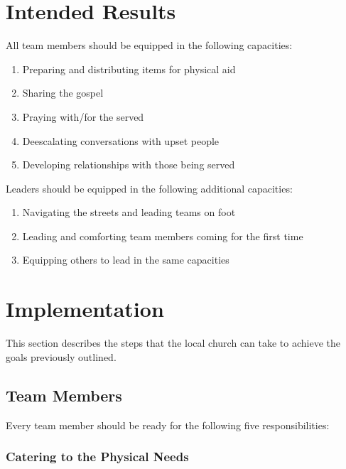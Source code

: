 \documentclass[12pt]{article}
\begin{document}
\qJamesOneTwentySeven

\section{Intended Results}

    All team members should be equipped in the following capacities:
    \begin{enumerate}
        \item Preparing and distributing items for physical aid
        \item Sharing the gospel
        \item Praying with/for the served
        \item Deescalating conversations with upset people
        \item Developing relationships with those being served
    \end{enumerate}

    Leaders should be equipped in the following additional capacities:
    \begin{enumerate}
        \item Navigating the streets and leading teams on foot
        \item Leading and comforting team members coming for the first time
        \item Equipping others to lead in the same capacities
    \end{enumerate}

\section{Implementation}

This section describes the steps that the local church can take to achieve the goals previously outlined.

\subsection{Team Members}

    Every team member should be ready for the following five responsibilities:

\subsubsection{Catering to the Physical Needs}
\end{document}
